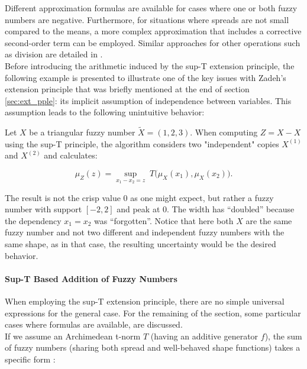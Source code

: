 Different approximation formulas are available for cases where one or both fuzzy numbers are negative. Furthermore, for situations where spreads are not small compared to the means, a more complex approximation that includes a corrective second-order term can be employed. Similar approaches for other operations such as division are detailed in \cite{ApprLRFuzzNum}.\\

Before introducing the arithmetic induced by the sup-T extension principle, the following example is presented to illustrate one of the key issues with Zadeh's extension principle that was briefly mentioned at the end of section \ref{sec:ext_pple}: its implicit assumption of independence between variables. This assumption leads to the following unintuitive behavior:

\begin{example}\label{ex:unc_inflation} 


    Let $X$ be a triangular fuzzy number $\tilde X=(1,2,3)$. When computing $Z=X-X$ using the sup-T principle, the algorithm considers two "independent" copies $X^{(1)}$ and $X^{(2)}$ and calculates:
    
    $$
    \mu_Z(z)=\sup_{x_1-x_2=z}\;T\!\bigl(\mu_{X}(x_1),\mu_{X}(x_2)\bigr).
    $$
    
    The result is not the crisp value 0 as one might expect, but rather a fuzzy number with support $[-2,2]$ and peak at 0. The width has ``doubled'' because the dependency $x_1=x_2$ was ``forgotten''. Notice that here both $X$ are the same fuzzy number and not two different and independent fuzzy numbers with the same shape, as in that case, the resulting uncertainty would be the desired behavior.
    \end{example}

\paragraph{Sup-T Based Addition of Fuzzy Numbers}
When employing the sup-T extension principle, there are no simple universal expressions for the general case. For the remaining of the section, some particular cases where formulas are available, are discussed.\\

If we assume an Archimedean t-norm $T$ (having an additive generator $f$), the sum of fuzzy numbers (sharing both spread and well-behaved shape functions) takes a specific form \cite[Thm. 1.7.1]{FULLER2}:


